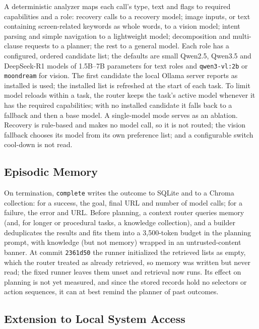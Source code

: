A deterministic analyzer maps each call's type, text and flags to required capabilities and a role: recovery calls to a recovery model; image inputs, or text containing screen-related keywords as whole words, to a vision model; intent parsing and simple navigation to a lightweight model; decomposition and multi-clause requests to a planner; the rest to a general model. Each role has a configured, ordered candidate list; the defaults are small Qwen2.5, Qwen3.5 and DeepSeek-R1 models of 1.5B--7B parameters for text roles and \texttt{qwen3-vl:2b} or \texttt{moondream} for vision. The first candidate the local Ollama server reports as installed is used; the installed list is refreshed at the start of each task. To limit model reloads within a task, the router keeps the task's active model whenever it has the required capabilities; with no installed candidate it falls back to a fallback and then a base model. A single-model mode serves as an ablation. Recovery is rule-based and makes no model call, so it is not routed; the vision fallback chooses its model from its own preference list; and a configurable switch cool-down is not read.


\subsection{Episodic Memory}
\label{sec:memory}

On termination, \texttt{complete} writes the outcome to SQLite and to a Chroma collection: for a success, the goal, final URL and number of model calls; for a failure, the error and URL. Before planning, a context router queries memory (and, for longer or procedural tasks, a knowledge collection), and a builder deduplicates the results and fits them into a 3{,}500-token budget in the planning prompt, with knowledge (but not memory) wrapped in an untrusted-content banner. At commit \texttt{2361d50} the runner initialized the retrieved lists as empty, which the router treated as already retrieved, so memory was written but never read; the fixed runner leaves them unset and retrieval now runs. Its effect on planning is not yet measured, and since the stored records hold no selectors or action sequences, it can at best remind the planner of past outcomes.

\subsection{Extension to Local System Access}
\label{sec:desktop}

